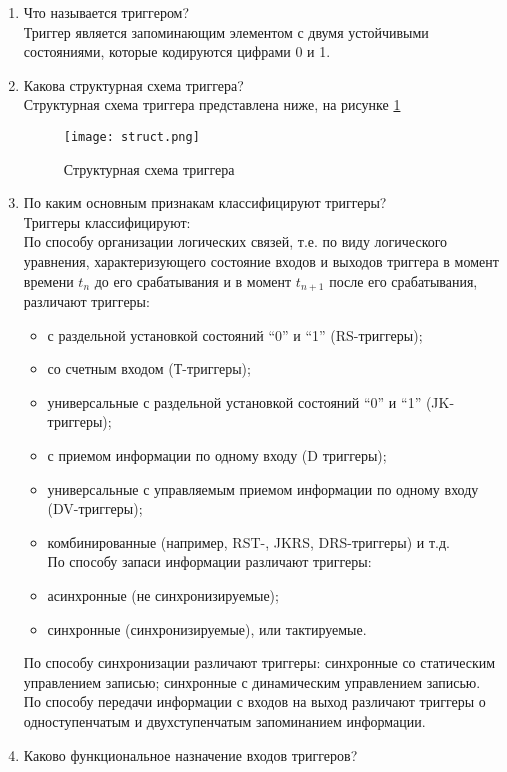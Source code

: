 \begin{enumerate}
	\item Что называется триггером? \\
	Триггер является запоминающим элементом с двумя устойчивыми состояниями, которые
	кодируются цифрами 0 и 1.
	\item Какова структурная схема триггера? \\
	Структурная схема триггера представлена ниже, на рисунке \ref{struct}
	\begin{figure}
		\centering
		\texttt{[image: struct.png]}
		\caption{Структурная схема триггера}
		\label{struct}
	\end{figure} 
	\item По каким основным признакам классифицируют триггеры? \\ 
	Триггеры классифицируют:\\ По способу организации логических связей, т.е. по виду логического уравнения,
	характеризующего состояние входов и выходов триггера в момент времени $t_n$ до его
	срабатывания и в момент $t_{n+1}$ после его срабатывания, различают триггеры:
	\begin{itemize}
		\item  с раздельной установкой состояний “0” и “1” (RS-триггеры);
		\item  со счетным входом (Т-триггеры);
		\item  универсальные с раздельной установкой состояний “0” и “1” (JK-триггеры);
		\item  с приемом информации по одному входу (D триггеры);
		\item  универсальные с управляемым приемом информации по одному входу (DV-триггеры);
		\item  комбинированные (например, RST-, JKRS, DRS-триггеры) и т.д.\\
		По способу запаси информации различают триггеры:
		\item  асинхронные (не синхронизируемые);
		\item  синхронные (синхронизируемые), или тактируемые.
	\end{itemize}
	По способу синхронизации различают триггеры: синхронные со статическим управлением
	записью; синхронные с динамическим управлением записью.\\
	По способу передачи информации с входов на выход различают триггеры о
	одноступенчатым и двухступенчатым запоминанием информации.
	\item Каково функциональное назначение входов триггеров? \\

\end{enumerate}
